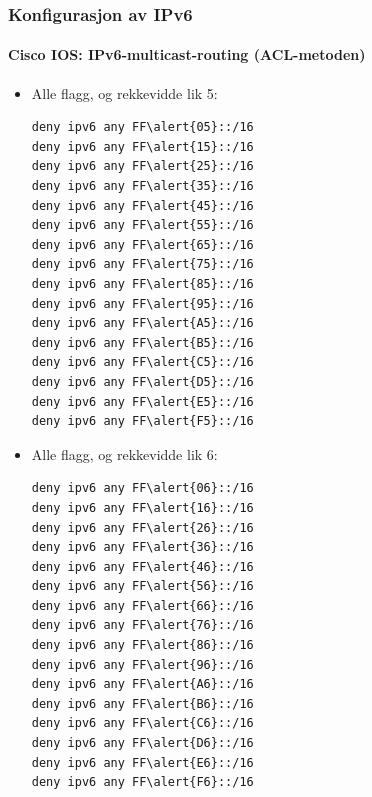 \begin{frame}[fragile]%
  \frametitle{Konfigurasjon av IPv6}
  \framesubtitle{Cisco IOS: IPv6-multicast-routing (ACL-metoden)}
  \begin{multicols}{2}
    \begin{itemize}%
    \item Alle flagg, og rekkevidde lik 5:
\begin{Verbatim}[commandchars=\\\{\},fontsize=\scriptsize]
deny ipv6 any FF\alert{05}::/16
deny ipv6 any FF\alert{15}::/16
deny ipv6 any FF\alert{25}::/16
deny ipv6 any FF\alert{35}::/16
deny ipv6 any FF\alert{45}::/16
deny ipv6 any FF\alert{55}::/16
deny ipv6 any FF\alert{65}::/16
deny ipv6 any FF\alert{75}::/16
deny ipv6 any FF\alert{85}::/16
deny ipv6 any FF\alert{95}::/16
deny ipv6 any FF\alert{A5}::/16
deny ipv6 any FF\alert{B5}::/16
deny ipv6 any FF\alert{C5}::/16
deny ipv6 any FF\alert{D5}::/16
deny ipv6 any FF\alert{E5}::/16
deny ipv6 any FF\alert{F5}::/16
\end{Verbatim}
    \item Alle flagg, og rekkevidde lik 6:
\begin{Verbatim}[commandchars=\\\{\},fontsize=\scriptsize]
deny ipv6 any FF\alert{06}::/16
deny ipv6 any FF\alert{16}::/16
deny ipv6 any FF\alert{26}::/16
deny ipv6 any FF\alert{36}::/16
deny ipv6 any FF\alert{46}::/16
deny ipv6 any FF\alert{56}::/16
deny ipv6 any FF\alert{66}::/16
deny ipv6 any FF\alert{76}::/16
deny ipv6 any FF\alert{86}::/16
deny ipv6 any FF\alert{96}::/16
deny ipv6 any FF\alert{A6}::/16
deny ipv6 any FF\alert{B6}::/16
deny ipv6 any FF\alert{C6}::/16
deny ipv6 any FF\alert{D6}::/16
deny ipv6 any FF\alert{E6}::/16
deny ipv6 any FF\alert{F6}::/16
\end{Verbatim}
    \end{itemize}
  \end{multicols}
\end{frame}

